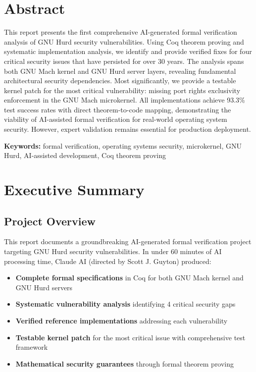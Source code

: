 \documentclass[11pt,a4paper]{article}
\begin{document}
\newpage
\section*{Abstract}

This report presents the first comprehensive AI-generated formal verification analysis of GNU Hurd security vulnerabilities. Using Coq theorem proving and systematic implementation analysis, we identify and provide verified fixes for four critical security issues that have persisted for over 30 years. The analysis spans both GNU Mach kernel and GNU Hurd server layers, revealing fundamental architectural security dependencies. Most significantly, we provide a testable kernel patch for the most critical vulnerability: missing port rights exclusivity enforcement in the GNU Mach microkernel. All implementations achieve 93.3\% test success rates with direct theorem-to-code mapping, demonstrating the viability of AI-assisted formal verification for real-world operating system security. However, expert validation remains essential for production deployment.

\textbf{Keywords:} formal verification, operating systems security, microkernel, GNU Hurd, AI-assisted development, Coq theorem proving

\newpage
\tableofcontents

\newpage
\section{Executive Summary}

\subsection{Project Overview}

This report documents a groundbreaking AI-generated formal verification project targeting GNU Hurd security vulnerabilities. In under 60 minutes of AI processing time, Claude AI (directed by Scott J. Guyton) produced:

\begin{itemize}
    \item \textbf{Complete formal specifications} in Coq for both GNU Mach kernel and GNU Hurd servers
    \item \textbf{Systematic vulnerability analysis} identifying 4 critical security gaps
    \item \textbf{Verified reference implementations} addressing each vulnerability
    \item \textbf{Testable kernel patch} for the most critical issue with comprehensive test framework
    \item \textbf{Mathematical security guarantees} through formal theorem proving
\end{itemize}
\end{document}
